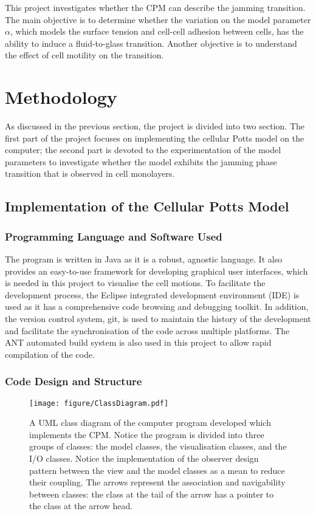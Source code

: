 \documentclass[a4paper,12pt]{article}
\begin{document}
This project investigates whether the CPM can describe the jamming transition. The main objective is to determine whether the variation on the model parameter $\alpha$, which models the surface tension and cell-cell adhesion between cells, has the ability to induce a fluid-to-glass transition. Another objective is to understand the effect of cell motility on the transition. 



\section{Methodology}
As discussed in the previous section, the project is divided into two section. The first part of the project focuses on implementing the cellular Potts model on the computer; the second part is devoted to the experimentation of the model parameters to investigate whether the model exhibits the jamming phase transition that is observed in cell monolayers.

\subsection{Implementation of the Cellular Potts Model}
\subsubsection{Programming Language and Software Used}
The program is written in Java as it is a robust, agnostic language. It also provides an easy-to-use framework for developing graphical user interfaces, which is needed in this project to visualise the cell motions. To facilitate the development process, the Eclipse integrated development environment (IDE) is used as it has a comprehensive code browsing and debugging toolkit. In addition, the version control system, git, is used to maintain the history of the development and facilitate the synchronisation of the code across multiple platforms. The ANT automated build system is also used in this project to allow rapid compilation of the code.

\subsubsection{Code Design and Structure}



\begin{figure}[h]
\texttt{[image: figure/ClassDiagram.pdf]}
\caption{A UML class diagram of the computer program developed which implements the CPM. Notice the program is divided into three groups of classes: the model classes, the visualisation classes, and the I/O classes. Notice the implementation of the observer design pattern between the view and the model classes as a mean to reduce their coupling. The arrows represent the association and navigability between classes: the class at the tail of the arrow has a pointer to the class at the arrow head.}
\label{fig:ClassDiagram}
\end{figure}
\end{document}
